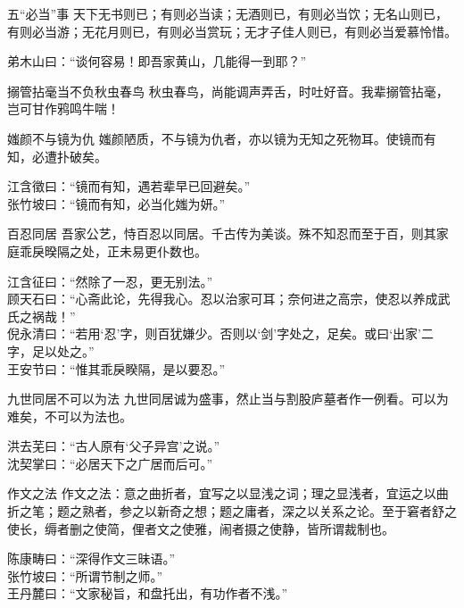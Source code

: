 \begin{yulu}{五“必当”事}
天下无书则已；有则必当读；无酒则已，有则必当饮；无名山则已，有则必当游；无花月则已，有则必当赏玩；无才子佳人则已，有则必当爱慕怜惜。
\begin{comments}
弟木山曰：“谈何容易！即吾家黄山，几能得一到耶？”
\end{comments}
\end{yulu}

\begin{yulu}{搦管拈毫当不负秋虫春鸟}
秋虫春鸟，尚能调声弄舌，时吐好音。我辈搦管拈毫，岂可甘作鸦鸣牛喘！
\begin{comments}

\end{comments}
\end{yulu}

\begin{yulu}{媸颜不与镜为仇}
媸颜陋质，不与镜为仇者，亦以镜为无知之死物耳。使镜而有知，必遭扑破矣。
\begin{comments}
江含徵曰：“镜而有知，遇若辈早已回避矣。” \\
张竹坡曰：“镜而有知，必当化媸为妍。”
\end{comments}
\end{yulu}

\begin{yulu}{百忍同居}
吾家公艺，恃百忍以同居。千古传为美谈。殊不知忍而至于百，则其家庭乖戾暌隔之处，正未易更仆数也。
\begin{comments}
江含征曰：“然除了一忍，更无别法。” \\
顾天石曰：“心斋此论，先得我心。忍以治家可耳；奈何进之高宗，使忍以养成武氏之祸哉！” \\
倪永清曰：“若用‘忍’字，则百犹嫌少。否则以‘剑’字处之，足矣。或曰‘出家’二字，足以处之。” \\
王安节曰：“惟其乖戾睽隔，是以要忍。”
\end{comments}
\end{yulu}

\begin{yulu}{九世同居不可以为法}
九世同居诚为盛事，然止当与割股庐墓者作一例看。可以为难矣，不可以为法也。
\begin{comments}
洪去芜曰：“古人原有‘父子异宫’之说。” \\
沈契掌曰：“必居天下之广居而后可。”
\end{comments}
\end{yulu}

\begin{yulu}{作文之法}
作文之法：意之曲折者，宜写之以显浅之词；理之显浅者，宜运之以曲折之笔；题之熟者，参之以新奇之想；题之庸者，深之以关系之论。至于窘者舒之使长，缛者删之使简，俚者文之使雅，闹者摄之使静，皆所谓裁制也。
\begin{comments}
陈康畴曰：“深得作文三昧语。” \\
张竹坡曰：“所谓节制之师。” \\
王丹麓曰：“文家秘旨，和盘托出，有功作者不浅。”
\end{comments}
\end{yulu}

